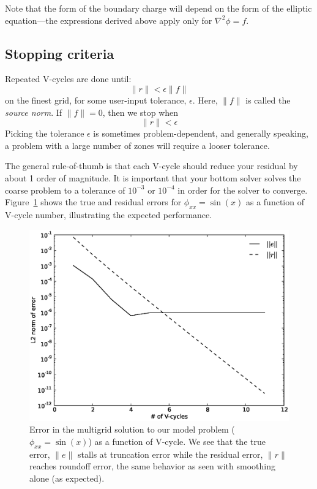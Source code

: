 Note that the form of the boundary charge will depend on the form of the
elliptic equation---the expressions derived above apply only for
$\nabla^2 \phi = f$.




\subsection{Stopping criteria}

Repeated V-cycles are done until:
\begin{equation}
\| r \| < \epsilon \|f\|
\end{equation}
on the finest grid, for some user-input tolerance, $\epsilon$.  Here,
$\|f\|$ is called the {\em source norm}.  If $\|f\| = 0$, then we stop
when
\begin{equation}
\| r \| < \epsilon 
\end{equation}
Picking the tolerance $\epsilon$ is sometimes problem-dependent, and
generally speaking, a problem with a large number of zones will require
a looser tolerance.

The general rule-of-thumb is that each V-cycle should reduce your
residual by about 1 order of magnitude.  It is important that your
bottom solver solves the coarse problem to a tolerance of $10^{-3}$ or
$10^{-4}$ in order for the solver to converge.  Figure~\ref{fig:mgerror}
shows the true and residual errors for $\phi_{xx} = \sin(x)$ as a function
of V-cycle number, illustrating the expected performance.


\begin{figure}
\centering
\includegraphics[width=0.85\linewidth]{mg_error_vs_cycle}
\caption[Error in solution as a function of multigrid V-cycle
  number]{\label{fig:mgerror} Error in the multigrid solution to our
  model problem ($\phi_{xx} = \sin(x)$) as a function of V-cycle.  We
  see that the true error, $\|e\|$ stalls at truncation error while
  the residual error, $\|r\|$ reaches roundoff error, the same
  behavior as seen with smoothing alone (as expected). \\
  }
\end{figure}

